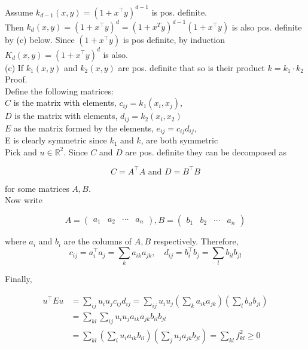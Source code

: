 \documentclass[18pt]{article}
\begin{document}
\begin{flushleft}
Assume \(k_{d-1}(x, y)=\left(1+x^{\top} y\right)^{d-1}\) is pos. definite.\\
Then \(k_{d}(x, y)=\left(1+x^{\top} y\right)^{d}=\left(1+x^{T} y\right)^{d-1}\left(1+x^{\top} y\right)\) is also pos. definite
by (c) below. Since \(\left(1+x^{\top} y\right)\) is pos definite, by induction \(K_{d}(x, y)=\left(1+x^{\top} y\right)^{d}\)
is also.\\
\vspace{.5cm}
(c) If \(k_{1}(x, y)\) and \(k_{2}(x, y)\) are pos. definite that so is their product \(k=k_{1} \cdot k_{2}\)
\vspace{.5cm}
Proof.\\
\vspace{.5cm}
Define the following matrices:\\
\(C\) is the matrix with elements, \(c_{i j}=k_{1}\left(x_{i}, x_{j}\right)\),\\
\(D\) is the matrix with elements, \(d_{i j}=k_{2}\left(x_{i}, x_{2}\right)\)\\
\(E\) as the matrix formed by the elements, \(e_{i j}=c_{i j} d_{i j}\),\\
\vspace{.5cm}
E is clearly symmetric since \(k_{1}\) and \(k\), are both symmetric\\
\vspace{.5cm}
Pick and \(u \in \mathbb{R}^{2}\). Since \(C\) and \(D\) are pos. definite they can be decomposed as

\[
C=A^{\top} A \text { and } D=B^{\top} B
\]

for some matrices \(A, B\).\\
\vspace{.5cm}
Now write

\[
A=\left(\begin{array}{llll}
a_{1} & a_{2} & \cdots & a_{n}
\end{array}\right), B=\left(\begin{array}{llll}
    b_{1} & b_{2} & \cdots & a_{n}
    \end{array}\right)
\]

where \(a_{i}\) and \(b_{i}\) are the columns of \(A, B\) respectively. Therefore,\\

\[
c_{i j}=a_{i}^{\top} a_{j}=\sum_{k} a_{i k} a_{j k}, \quad d_{i j}=b_{i}^{\top} b_{j}=\sum_{l} b_{i l} b_{j l}
\]

Finally,

\[
\begin{aligned}
u^{\top} E u & =\sum_{i j} u_{i} u_{j} c_{i j} d_{i j}=\sum_{i j} u_{i} u_{j}\left(\sum_{k} a_{i k} a_{j k}\right)\left(\sum_{l} b_{i l} b_{j l}\right) \\
& =\sum_{k l} \sum_{i j} u_{i} u_{j} a_{i k} a_{j k} b_{i l} b_{j l} \\
& =\sum_{k l}\left(\sum_{i} u_{i} a_{i k} b_{i l}\right)\left(\sum_{j} u_{j} a_{j k} b_{j l}\right)=\sum_{k l} f_{k l}^{2} \geqslant 0
\end{aligned}
\]


\end{flushleft}
\end{document}
